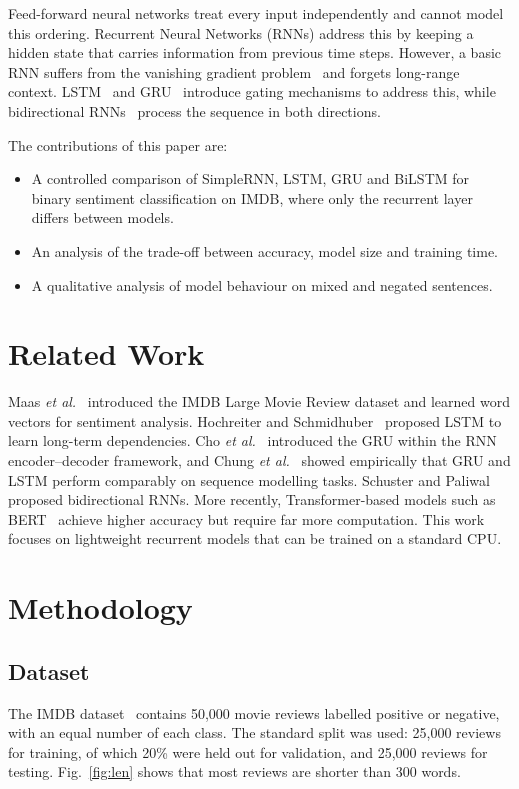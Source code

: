 \documentclass[conference]{IEEEtran}
\begin{document}
Feed-forward neural networks treat every input independently and cannot model this ordering. Recurrent Neural Networks (RNNs) address this by keeping a hidden state that carries information from previous time steps. However, a basic RNN suffers from the vanishing gradient problem~\cite{bengio1994} and forgets long-range context. LSTM~\cite{hochreiter1997} and GRU~\cite{cho2014} introduce gating mechanisms to address this, while bidirectional RNNs~\cite{schuster1997} process the sequence in both directions.

The contributions of this paper are:
\begin{itemize}
\item A controlled comparison of SimpleRNN, LSTM, GRU and BiLSTM for binary sentiment classification on IMDB, where only the recurrent layer differs between models.
\item An analysis of the trade-off between accuracy, model size and training time.
\item A qualitative analysis of model behaviour on mixed and negated sentences.
\end{itemize}

\section{Related Work}
Maas \textit{et al.}~\cite{maas2011} introduced the IMDB Large Movie Review dataset and learned word vectors for sentiment analysis. Hochreiter and Schmidhuber~\cite{hochreiter1997} proposed LSTM to learn long-term dependencies. Cho \textit{et al.}~\cite{cho2014} introduced the GRU within the RNN encoder--decoder framework, and Chung \textit{et al.}~\cite{chung2014} showed empirically that GRU and LSTM perform comparably on sequence modelling tasks. Schuster and Paliwal~\cite{schuster1997} proposed bidirectional RNNs. More recently, Transformer-based models such as BERT~\cite{devlin2019} achieve higher accuracy but require far more computation. This work focuses on lightweight recurrent models that can be trained on a standard CPU.

\section{Methodology}

\subsection{Dataset}
The IMDB dataset~\cite{maas2011} contains 50,000 movie reviews labelled positive or negative, with an equal number of each class. The standard split was used: 25,000 reviews for training, of which 20\% were held out for validation, and 25,000 reviews for testing. Fig.~\ref{fig:len} shows that most reviews are shorter than 300 words.
\end{document}
